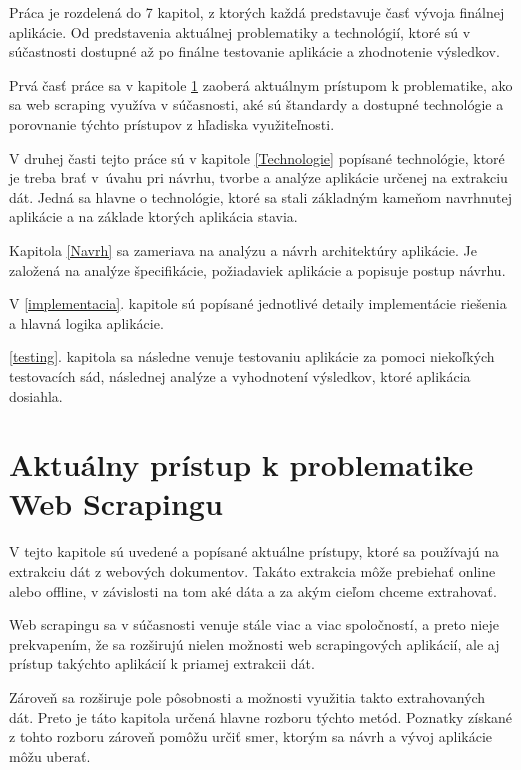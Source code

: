 \newpage

Práca je rozdelená do 7 kapitol, z ktorých každá predstavuje časť vývoja finálnej aplikácie. Od predstavenia aktuálnej problematiky a technológií, ktoré sú v súčastnosti dostupné až po finálne testovanie aplikácie a zhodnotenie výsledkov.

\bigskip

Prvá časť práce sa v kapitole \ref{aktualny_pristup} zaoberá aktuálnym prístupom k problematike, ako sa web scraping využíva v súčasnosti, aké sú štandardy a dostupné technológie a porovnanie týchto prístupov z hľadiska využiteľnosti.

V druhej časti tejto práce sú v kapitole \ref{Technologie} popísané technológie, ktoré je treba brať \mbox{v úvahu} pri návrhu, tvorbe a analýze aplikácie určenej na extrakciu dát. Jedná sa hlavne o technológie, ktoré sa stali základným kameňom navrhnutej aplikácie a na základe ktorých aplikácia stavia.

Kapitola \ref{Navrh} sa zameriava na analýzu a návrh architektúry aplikácie. Je založená na analýze špecifikácie, požiadaviek aplikácie a popisuje postup návrhu.

V \ref{implementacia}. kapitole sú popísané jednotlivé detaily implementácie riešenia a hlavná logika aplikácie.

\ref{testing}. kapitola sa následne venuje testovaniu aplikácie za pomoci niekoľkých testovacích sád, následnej analýze a vyhodnotení výsledkov, ktoré aplikácia dosiahla.


\chapter{Aktuálny prístup k problematike Web Scrapingu}
\label{aktualny_pristup}

V tejto kapitole sú uvedené a popísané aktuálne prístupy, ktoré sa používajú na extrakciu dát z webových dokumentov. Takáto extrakcia môže prebiehať online alebo offline, v závislosti na tom aké dáta a za akým cieľom chceme extrahovať.

Web scrapingu sa v súčasnosti venuje stále viac a viac spoločností, a preto nieje prekvapením, že sa rozširujú nielen možnosti web scrapingových aplikácií, ale aj prístup takýchto aplikácií k priamej extrakcii dát.

Zároveň sa rozširuje pole pôsobnosti a možnosti využitia takto extrahovaných dát. Preto je táto kapitola určená hlavne rozboru týchto metód. Poznatky získané z tohto rozboru zároveň pomôžu určiť smer, ktorým sa návrh a vývoj aplikácie môžu uberať. 


